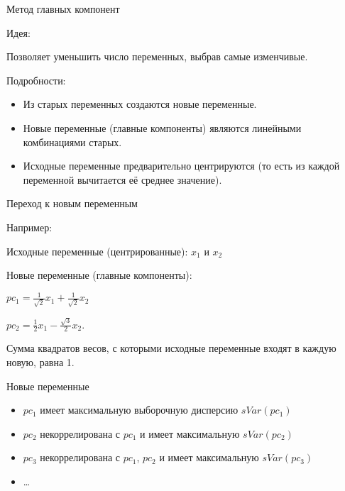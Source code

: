 \documentclass[ignorenonframetext,]{beamer}
\begin{document}
\begin{frame}{Метод главных компонент}

Идея:

Позволяет уменьшить число переменных, выбрав самые изменчивые.

Подробности:

\begin{itemize}
\item
  Из старых переменных создаются новые переменные.
\item
  Новые переменные (главные компоненты) являются линейными комбинациями
  старых.
\item
  Исходные переменные предварительно центрируются (то есть из каждой
  переменной вычитается её среднее значение).
\end{itemize}

\end{frame}

\begin{frame}{Переход к новым переменным}

Например:

Исходные переменные (центрированные): \(x_1\) и \(x_2\)

Новые переменные (главные компоненты):

\(pc_1=\frac{1}{\sqrt{2}}x_1+\frac{1}{\sqrt{2}}x_2\)

\(pc_2=\frac{1}{2}x_1-\frac{\sqrt{3}}{2}x_2\).

Сумма квадратов весов, с которыми исходные переменные входят в каждую
новую, равна 1.

\end{frame}

\begin{frame}{Новые переменные}

\begin{itemize}
\itemsep1pt\parskip0pt
\item
  \(pc_1\) имеет максимальную выборочную дисперсию \(sVar(pc_1)\)
\item
  \(pc_2\) некоррелирована с \(pc_1\) и имеет максимальную
  \(sVar(pc_2)\)
\item
  \(pc_3\) некоррелирована с \(pc_1\), \(pc_2\) и имеет максимальную
  \(sVar(pc_3)\)
\item
  \ldots{}
\end{itemize}

\end{frame}
\end{document}
